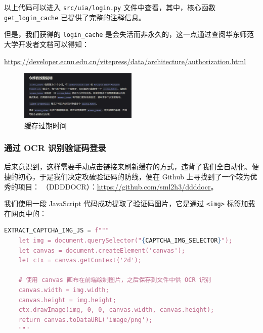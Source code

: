 \documentclass[14pt,a4paper,UTF8,twoside]{article}
\begin{document}
    \begin{note}
        以上代码可以进入 \texttt{src/uia/login.py} 文件中查看，其中，核心函数 \texttt{get\_login\_cache} 已提供了完整的注释信息。

        但是，我们获得的 \texttt{login\_cache} 是会失活而非永久的，这一点通过查阅华东师范大学开发者文档可以得知：

        \href{https://developer.ecnu.edu.cn/vitepress/data/architecture/authorization.html}{\underline{https://developer.ecnu.edu.cn/vitepress/data/architecture/authorization.html}}
    \end{note}

    \begin{figure}[H]
        \centering
        \includegraphics[width=0.5\textwidth]{img/open_platform.png}
        \caption{缓存过期时间}
        \label{fig:cache_expiration}
    \end{figure}

    \subsubsection{通过 OCR 识别验证码登录}

    后来意识到，这样需要手动点击链接来刷新缓存的方式，违背了我们全自动化、便捷的初心，于是我们决定攻破验证码的防线，便在 Github 上寻找到了一个较为优秀的项目：
    （DDDDOCR）：\href{https://github.com/sml2h3/ddddocr}{\underline{https://github.com/sml2h3/ddddocr}}。

    我们使用一段 JavaScript 代码成功提取了验证码图片，它是通过 \texttt{<img>} 标签加载在网页中的：

    \begin{lstlisting}[language=python]
    EXTRACT_CAPTCHA_IMG_JS = f"""
    let img = document.querySelector("{CAPTCHA_IMG_SELECTOR}");
    let canvas = document.createElement('canvas');
    let ctx = canvas.getContext('2d');

    # 使用 canvas 画布在前端绘制图片，之后保存到文件中供 OCR 识别
    canvas.width = img.width;
    canvas.height = img.height;
    ctx.drawImage(img, 0, 0, canvas.width, canvas.height);
    return canvas.toDataURL('image/png');
    """
    \end{lstlisting}
\end{document}
